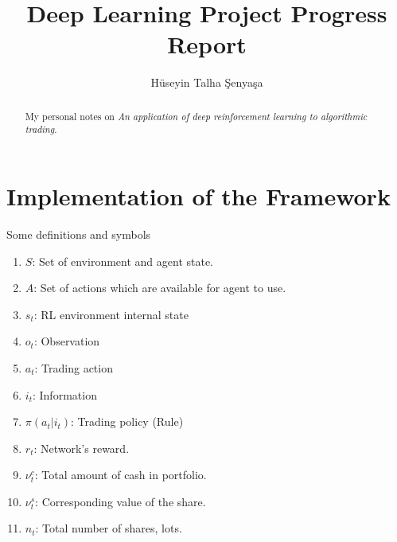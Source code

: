 \documentclass[twocolumn,aps,pra,superscriptaddress,nofootinbib,longbibliography]{revtex4-2}
\begin{document}
\title{Deep Learning Project Progress Report}

\author{H\"useyin Talha \c{S}enya\c{s}a}






\begin{abstract}
My personal notes on \textit{An application of deep reinforcement learning to algorithmic trading}.

\end{abstract}

\maketitle





\section{Implementation of the Framework}

Some definitions and symbols

\begin{enumerate}
    \item \(S\): Set of environment and agent state.
    \item \(A\): Set of actions which are available for agent to use.
    \item \(s_t\): RL environment internal state
    \item \(o_t\): Observation
    \item \(a_t\): Trading action 
    \item \(i_t\): Information
    \item \(\pi(a_t|i_t)\): Trading policy (Rule)
    \item \(r_t\): Network's reward.
    \item \(\nu_{t}^c\): Total amount of cash in portfolio. 
    \item \(\nu_{t}^s\): Corresponding value of the share.
    \item \(n_t\): Total number of shares, lots. 
\end{enumerate}
\end{document}
